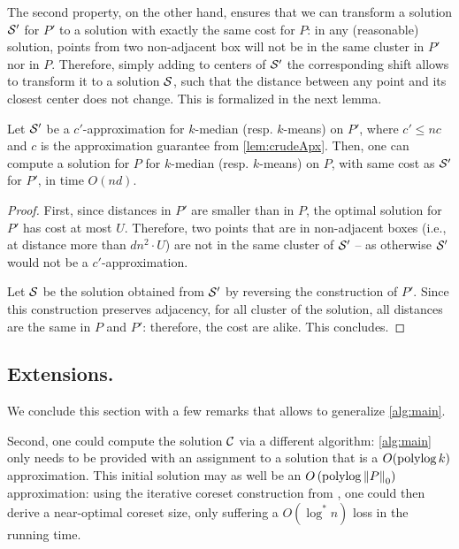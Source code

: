 The second property, on the other hand, ensures that we can transform a solution $\mathcal S'$ for $P'$ to a solution with exactly the same cost for $P$: in any (reasonable) solution, points from two non-adjacent box will not be in the same cluster in $P'$ nor in $P$. Therefore, simply adding to centers of $\mathcal S'$ the corresponding shift allows to transform it to a solution $\mathcal S$, such that the distance between any point and its closest center does not change. This is formalized in the next lemma.

\begin{lemma}
Let $\mathcal S'$ be a $c'$-approximation for  $k$-median (resp. $k$-means) on $P'$, where $c' \leq nc$ and $c$ is the approximation guarantee from \cref{lem:crudeApx}. Then, one can compute a solution for $P$ for $k$-median (resp. $k$-means) on $P$, with same cost as $\mathcal S'$ for $P'$, in time $O(nd)$.
\end{lemma}
\begin{proof}
First, since distances in $P'$ are smaller than in $P$, the optimal solution for $P'$ has cost at most $U$. Therefore, two points that are in non-adjacent boxes (i.e., at distance more than $d n^2\cdot U$) are not in the same cluster of $\mathcal S'$ -- as otherwise $\mathcal S'$ would not be a $c'$-approximation.

Let $\mathcal S$ be the solution obtained from $\mathcal S'$ by reversing the construction of $P'$. Since this construction preserves adjacency, for all cluster of the solution, all distances are the same in $P$ and $P'$: therefore, the cost are alike. This concludes.
\end{proof}


\subsection*{Extensions.} 
We conclude this section with a few remarks that allows to generalize \cref{alg:main}.

Second, one could compute the solution $\mathcal C$ via a different algorithm: \cref{alg:main} only needs to be provided with an assignment to a solution that is a $O(\operatorname{polylog} k)$ approximation. 
This initial solution may as well be an $O\left(\operatorname{polylog} \left\| P \right\|_0 \right)$ approximation: using the iterative coreset construction from \cite{BravermanJKW21}, one could then derive a near-optimal coreset size, only suffering a $O(\log^* n)$ loss in the running time.

